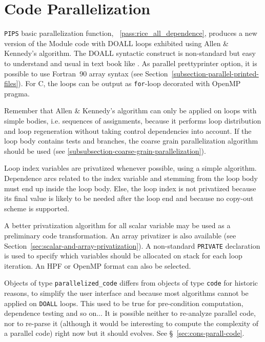 \documentclass[a4paper]{report}
\newcommand{\PipsPassRef}[1]{\texttt{\detokenize{#1}}~\ref{pass:#1}}
\newenvironment{PipsPass}[1]{\label{pass:#1}}{}
\newcommand{\Pips}{\texttt{PIPS}}
\begin{document}
\section{Code Parallelization}
\label{subsection-parallelization}

\begin{PipsPass}{parallelized_code}
\Pips{} basic parallelization function, \PipsPassRef{rice_all_dependence},
produces a new version of the Module code with DOALL loops exhibited using
A{\sc llen} \& K{\sc ennedy}'s algorithm. The DOALL syntactic construct is
non-standard but easy to understand and usual in text book like \cite{Wolfe96}.
As parallel prettyprinter option, it is possible to use Fortran~90 array
syntax (see Section~\ref{subsection-parallel-printed-files}). For C, the
loops can be output as \texttt{for}-loop decorated with OpenMP pragma.

Remember that A{\sc llen} \& K{\sc ennedy}'s algorithm can only be applied
on loops with simple bodies, i.e. sequences of assignments, because it
performs loop distribution and loop regeneration without taking control
dependencies into account. If the loop body contains tests and branches,
the coarse grain parallelization algorithm should be used (see
\ref{subsubsection-coarse-grain-parallelization}).

Loop index variables are privatized whenever possible, using a simple
algorithm. Dependence arcs related to the index variable and stemming
from the loop body must end up inside the loop body. Else, the loop
index is not privatized because its final value is likely to be needed
after the loop end and because no copy-out scheme is supported.

A better privatization algorithm for all scalar variable may be used as a
preliminary code transformation. An array privatizer is also available
(see Section~\ref{sec:scalar-and-array-privatization}). A non-standard
{\tt PRIVATE} declaration is used to specify which variables should be
allocated on stack for each loop iteration. An HPF or OpenMP format can
also be selected.

Objects of type \verb+parallelized_code+ differs from objects of type
\verb+code+ for historic reasons, to simplify the user interface and
because most algorithms cannot be applied on {\tt DOALL} loops. This used
to be true for pre-condition computation, dependence testing and so
on... It is possible neither to re-analyze parallel code, nor to re-parse
it (although it would be interesting to compute the complexity of a
parallel code) right now but it should evolves. See
\S~\ref{sec:cons-parall-code}.
\end{PipsPass}
\end{document}
